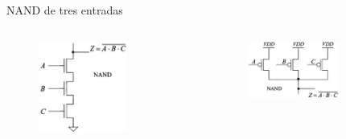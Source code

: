 \documentclass[aspectratio=169,t]{beamer}
\begin{document}
\begin{frame}{NAND de tres entradas}

\begin{columns}

\begin{column}{0.5\textwidth}

\begin{figure}
    \centering
    \includegraphics[width=0.7\textwidth]{figuras/aoi_nand_1.png}
\end{figure}

\end{column}

\begin{column}{0.5\textwidth}

\begin{figure}
    \centering
    \includegraphics[width=0.7\textwidth]{figuras/aoi_nand_2.png}
\end{figure}

\end{column}

\end{columns}
    
\end{frame}
\end{document}
